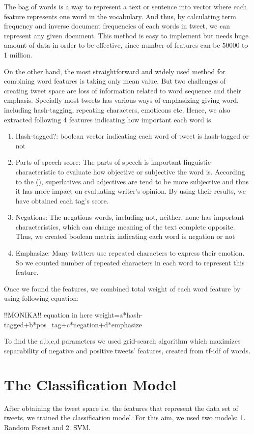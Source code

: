 \documentclass[10pt,conference,compsocconf]{IEEEtran}
\begin{document}
The bag of words is a way to represent a text or sentence into vector where each feature represents one word in the vocabulary. And thus, by calculating term frequency and inverse document frequencies of each words in tweet, we can represent any given document. This method is easy to implement but needs huge amount of data in order to be effective, since number of features can be 50000 to 1 million. 

On the other hand, the most straightforward and widely used method for combining word features is taking only mean value. But two challenges of creating tweet space are loss of information related to word sequence and their emphasis. Specially most tweets has various ways of emphasizing giving word, including hash-tagging, repeating characters, emoticons etc. Hence, we also extracted following 4 features indicating how important each word is.
\begin{enumerate}
\item Hash-tagged?: boolean vector indicating each word of tweet is hash-tagged or not
\item Parts of speech score: The parts of speech is important linguistic characteristic to evaluate how objective or subjective the word is. According to the (\cite{corpus}), superlatives and adjectives are tend to be more subjective and thus it has more impact on evaluating writer's opinion. By using their results, we have obtained each tag's score.
\item Negations: The negations words, including not, neither, none has important characteristics, which can change meaning of the text complete opposite. Thus, we created boolean matrix indicating each word is negation or not
\item Emphasize: Many twitters use repeated characters to express their emotion. So we counted number of repeated characters in each word to represent this feature.
\end{enumerate}
Once we found the features, we combined total weight of each word feature by using following equation:

!!MONIKA!! equation in here 
weight=a*hash-tagged+b*pos_tag+c*negation+d*emphasize 

To find the a,b,c,d parameters we used grid-search algorithm which maximizes separability of negative and positive tweets' features, created from tf-idf of words.

\section{The Classification Model}
After obtaining the tweet space i.e. the features that represent the data set of tweets, we trained the classification model. For this aim, we used two models: 1. Random Forest and 2. SVM. 
\end{document}
